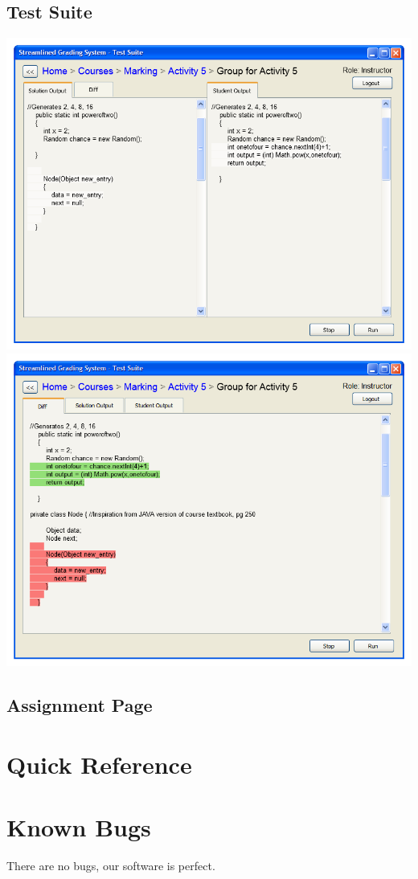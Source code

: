\documentclass{article}
\begin{document}
\subsection{Test Suite}
\begin{center}
\includegraphics[scale=0.6]{../images/UIMockups/PNG_Renders/SRS_TestSuite_Split}
\includegraphics[scale=0.6]{../images/UIMockups/PNG_Renders/SRS_TestSuite_Tabs}
\end{center}

\subsection{Assignment Page}

\section{Quick Reference}  %

\section{Known Bugs}
There are no bugs, our software is perfect.
\end{document}
